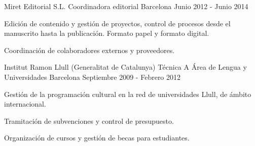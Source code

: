 \begin{cventries}
  \cventry
    {Miret Editorial S.L.} %
    {Coordinadora editorial} %
    {Barcelona} %
    {Junio 2012 - Junio 2014} %
    {
      \begin{cvitems} %
        \item {Edición de contenido y gestión de proyectos, control de procesos desde el manuscrito hasta la publicación. Formato papel y formato digital.}
        \item {Coordinación de colaboradores externos y proveedores.}
      \end{cvitems}
    }

  \cventry
    {Institut Ramon Llull (Generalitat de Catalunya)} %
    {Técnica A Área de Lengua y Universidades} %
    {Barcelona} %
    {Septiembre 2009 - Febrero 2012} %
    {
      \begin{cvitems} %
        \item {Gestión de la programación cultural en la red de universidades Llull, de ámbito internacional.}
        \item {Tramitación de subvenciones y control de presupuesto.}
        \item {Organización de cursos y gestión de becas para estudiantes.}
      \end{cvitems}
    }
\end{cventries}
